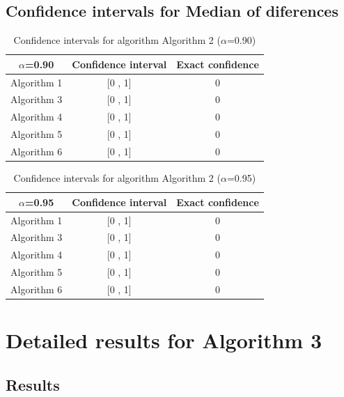 \documentclass[a4paper,10pt]{article}
\begin{document}
\subsection{Confidence intervals for Median of diferences}

\begin{table}[!htp]
\centering\small
\begin{tabular}{
|c|c|c|}
\hline
 $\alpha$=0.90 & Confidence interval & Exact confidence \\ \hline 
Algorithm 1 & [0 , 1] & 0\\ \hline 
Algorithm 3 & [0 , 1] & 0\\ \hline 
Algorithm 4 & [0 , 1] & 0\\ \hline 
Algorithm 5 & [0 , 1] & 0\\ \hline 
Algorithm 6 & [0 , 1] & 0\\ \hline 

\end{tabular}
\caption{Confidence intervals for algorithm Algorithm 2 ($\alpha$=0.90)}
\end{table}
\begin{table}[!htp]
\centering\small
\begin{tabular}{
|c|c|c|}
\hline
 $\alpha$=0.95 & Confidence interval & Exact confidence \\ \hline 
Algorithm 1 & [0 , 1] & 0\\ \hline 
Algorithm 3 & [0 , 1] & 0\\ \hline 
Algorithm 4 & [0 , 1] & 0\\ \hline 
Algorithm 5 & [0 , 1] & 0\\ \hline 
Algorithm 6 & [0 , 1] & 0\\ \hline 

\end{tabular}
\caption{Confidence intervals for algorithm Algorithm 2 ($\alpha$=0.95)}
\end{table}

 \clearpage 


\section{Detailed results for Algorithm 3}


\subsection{Results}
\end{document}
